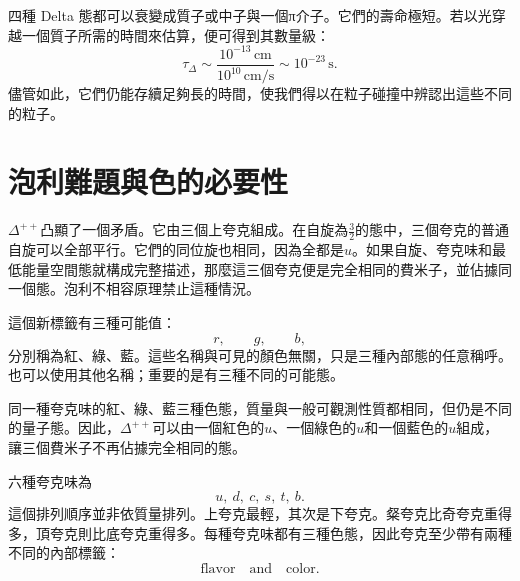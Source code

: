 四種 Delta 態都可以衰變成質子或中子與一個{\proseunicodefont π}介子。它們的壽命極短。若以光穿越一個質子所需的時間來估算，便可得到其數量級：
\begin{equation}
\tau_\Delta
\sim
\frac{10^{-13}\,\mathrm{cm}}
     {10^{10}\,\mathrm{cm/s}}
\sim10^{-23}\,\mathrm{s}.
\end{equation}
儘管如此，它們仍能存續足夠長的時間，使我們得以在粒子碰撞中辨認出這些不同的粒子。

\begin{classroomqa}
\end{classroomqa}

\section{泡利難題與色的必要性}

\(\Delta^{++}\)凸顯了一個矛盾。它由三個上夸克組成。在自旋為\(\tfrac32\)的態中，三個夸克的普通自旋可以全部平行。它們的同位旋也相同，因為全都是\(u\)。如果自旋、夸克味和最低能量空間態就構成完整描述，那麼這三個夸克便是完全相同的費米子，並佔據同一個態。泡利不相容原理禁止這種情況。

\begin{classroomqa}
\end{classroomqa}

這個新標籤有三種可能值：
\begin{equation}
r,\qquad g,\qquad b,
\end{equation}
分別稱為紅、綠、藍。這些名稱與可見的顏色無關，只是三種內部態的任意稱呼。也可以使用其他名稱；重要的是有三種不同的可能態。

同一種夸克味的紅、綠、藍三種色態，質量與一般可觀測性質都相同，但仍是不同的量子態。因此，\(\Delta^{++}\)可以由一個紅色的\(u\)、一個綠色的\(u\)和一個藍色的\(u\)組成，讓三個費米子不再佔據完全相同的態。

六種夸克味為
\begin{equation}
u,\ d,\ c,\ s,\ t,\ b.
\end{equation}
這個排列順序並非依質量排列。上夸克最輕，其次是下夸克。粲夸克比奇夸克重得多，頂夸克則比底夸克重得多。每種夸克味都有三種色態，因此夸克至少帶有兩種不同的內部標籤：
\begin{equation}
\text{flavor}\quad\text{and}\quad\text{color}.
\end{equation}

